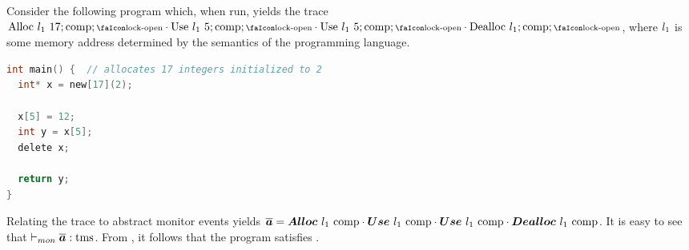 \documentclass[utf8,acmsmall,review,screen,dvipsnames]{acmart}
\begin{document}
\begin{example}
  Consider the following program which, when run, yields the trace $\ev{Alloc}\ \loc[_{1}]\ 17;\comp;\unlock\cdot\ev{Use}\ \loc[_{1}]\ 5;\comp;\unlock\cdot\ev{Use}\ \loc[_{1}]\ 5;\comp;\unlock\cdot\ev{Dealloc}\ \loc[_{1}];\comp;\unlock$, where $\loc[_{1}]$ is some memory address determined by the semantics of the programming language.
  \begin{lstlisting}[language=c,basicstyle=\ttfamily,morekeywords={new,delete}]
int main() {  // allocates 17 integers initialized to 2
  int* x = new[17](2);

  x[5] = 12;
  int y = x[5];
  delete x;

  return y;
}
  \end{lstlisting}
  Relating the trace to abstract monitor events yields $\abstrace=\absev{Alloc}\ \loc[_{1}]\ \comp\cdot\absev{Use}\ \loc[_{1}]\ \comp\cdot\absev{Use}\ \loc[_{1}]\ \comp\cdot\absev{Dealloc}\ \loc[_{1}]\ \comp$.
  It is easy to see that $\montmssafe{\abstrace}$.
  From , it follows that the program satisfies .
\end{example}
\end{document}
